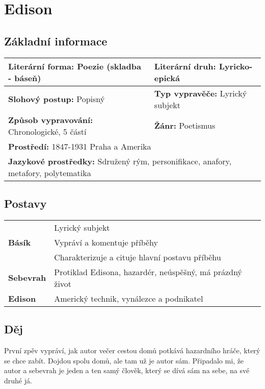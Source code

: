 \section{Edison}
\subsection*{Základní informace}
\begin{tabularx}{\linewidth}{l|l}
    \textbf{Literární forma:} Poezie (skladba - báseň)  & \textbf{Literární druh:} Lyricko-epická                  \\
    \hline
    \textbf{Slohový postup:} Popisný                    & \textbf{Typ vypravěče:} Lyrický subjekt                  \\
    \hline
    \textbf{Způsob vypravování:} Chronologické, 5 částí & \textbf{Žánr:} Poetismus                                 \\
    \hline
    \multicolumn{2}{l}{\textbf{Prostředí:} 1847-1931 Praha a Amerika}                                              \\
    \hline
    \multicolumn{2}{l}{\textbf{Jazykové prostředky:} Sdružený rým, personifikace, anafory, metafory, polytematika} \\
\end{tabularx}
\subsection*{Postavy}
\begin{tabularx}{\linewidth}{l|l}
    \multirow{3}{15em}{\textbf{Básík}} & Lyrický subjekt                                          \\
                                       & Vypráví a komentuje příběhy                              \\
                                       & Charakterizuje a cituje hlavní postavu příběhu           \\
    \hline
    \textbf{Sebevrah}                  & Protiklad Edisona, hazardér, neúspěšný, má prázdný život \\
    \hline
    \textbf{Edison}                    & Americký technik, vynálezce a podnikatel                 \\
\end{tabularx}
\subsection*{Děj}
První zpěv vypráví, jak autor večer cestou domů potkává hazardního hráče, který se chce zabít.
Dojdou spolu domů, ale tam už je autor sám.
Připadalo mi, že autor a sebevrah je jeden a ten samý člověk, který se dívá sám na sebe, na své druhé já.

